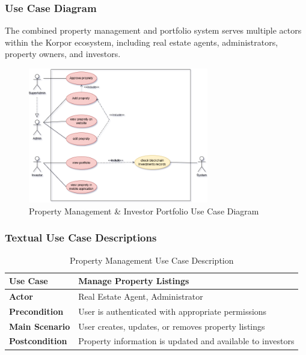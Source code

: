 \subsubsection{Use Case Diagram}
The combined property management and portfolio system serves multiple actors within the Korpor ecosystem, including real estate agents, administrators, property owners, and investors.
\newpage
\begin{figure}[htbp]
    \centering
    \includegraphics[width=0.7\textwidth]{images/property_portfolio_use_case.png}
    \caption{Property Management \& Investor Portfolio Use Case Diagram}
    \label{fig:property-portfolio-use-case}
\end{figure}

\subsubsection{Textual Use Case Descriptions}

\begin{table}[htbp]
    \centering
    \begin{tabular}{|p{3cm}|p{10cm}|}
        \hline
        \textbf{Use Case} & \textbf{Manage Property Listings} \\
        \hline
        \textbf{Actor} & Real Estate Agent, Administrator \\
        \hline
        \textbf{Precondition} & User is authenticated with appropriate permissions \\
        \hline
        \textbf{Main Scenario} & User creates, updates, or removes property listings \\
        \hline
        \textbf{Postcondition} & Property information is updated and available to investors \\
        \hline
    \end{tabular}
    \caption{Property Management Use Case Description}
    \label{tab:property-management-use-case}
\end{table}


